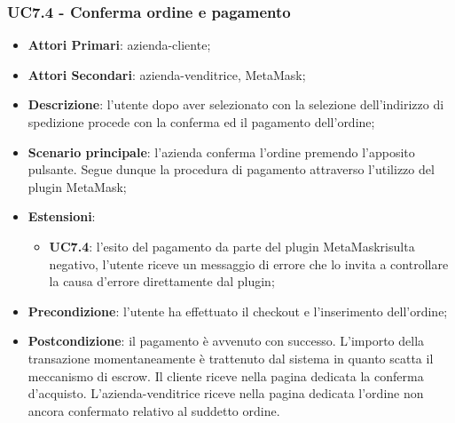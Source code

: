 \subsubsection{UC7.4 - Conferma ordine e pagamento}
\begin{itemize}
	\item \textbf{Attori Primari}: azienda-cliente;
	\item \textbf{Attori Secondari}: azienda-venditrice, MetaMask\glo;
	\item \textbf{Descrizione}: l'utente dopo aver selezionato con la selezione dell'indirizzo di spedizione procede con la conferma ed il pagamento dell'ordine;
	\item \textbf{Scenario principale}: l'azienda conferma l'ordine premendo l'apposito pulsante. Segue dunque la procedura di pagamento attraverso l'utilizzo del plugin MetaMask\glo;
	\item \textbf{Estensioni}: 
	\begin{itemize}
		\item \textbf{UC7.4}: l'esito del pagamento da parte del plugin MetaMask\glosp risulta negativo, l'utente riceve un messaggio di errore che lo invita a controllare la causa d'errore direttamente dal plugin; 
	\end{itemize}
	\item \textbf{Precondizione}: l'utente ha effettuato il checkout e l'inserimento dell'ordine;
	\item \textbf{Postcondizione}: il pagamento è avvenuto con successo. L'importo della transazione momentaneamente è trattenuto dal sistema in quanto scatta il meccanismo di escrow\glo. Il cliente riceve nella pagina dedicata la conferma d'acquisto\glo. L'azienda-venditrice riceve nella pagina dedicata l'ordine non ancora confermato relativo al suddetto ordine.
\end{itemize}


